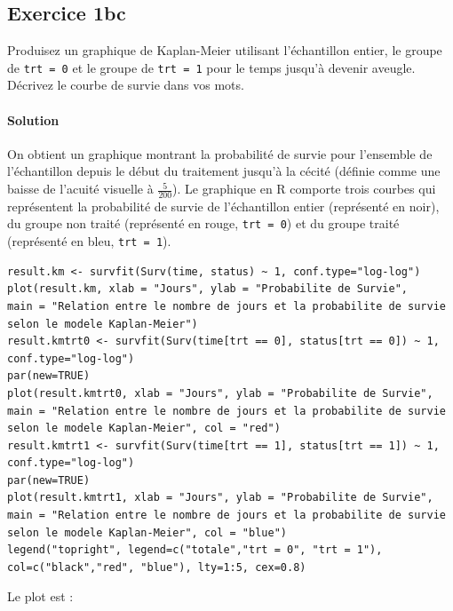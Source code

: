 \documentclass[../main.tex]{subfiles}
\begin{document}
\begin{CJK*}{UTF8}{gbsn}

\section*{Exercice 1bc}
Produisez un graphique de Kaplan-Meier utilisant l'échantillon entier,
le groupe de \texttt{trt = 0} et le groupe de \texttt{trt = 1} 
pour le temps jusqu'à devenir aveugle.
Décrivez le courbe de survie dans vos mots.

\paragraph{Solution}

On obtient un graphique montrant la probabilité de survie pour 
l'ensemble de l'échantillon depuis le début du traitement jusqu'à la cécité 
(définie comme une baisse de l'acuité visuelle à $\frac{5}{200}$).
Le graphique en R comporte trois courbes qui représentent 
la probabilité de survie de l'échantillon entier (représenté en noir), 
du groupe non traité (représenté en rouge, \texttt{trt = 0}) 
et du groupe traité (représenté en bleu, \texttt{trt = 1}). 

\begin{lstlisting}
result.km <- survfit(Surv(time, status) ~ 1, conf.type="log-log")
plot(result.km, xlab = "Jours", ylab = "Probabilite de Survie", 
main = "Relation entre le nombre de jours et la probabilite de survie selon le modele Kaplan-Meier")
result.kmtrt0 <- survfit(Surv(time[trt == 0], status[trt == 0]) ~ 1, conf.type="log-log")
par(new=TRUE)
plot(result.kmtrt0, xlab = "Jours", ylab = "Probabilite de Survie", 
main = "Relation entre le nombre de jours et la probabilite de survie selon le modele Kaplan-Meier", col = "red")
result.kmtrt1 <- survfit(Surv(time[trt == 1], status[trt == 1]) ~ 1, conf.type="log-log")
par(new=TRUE)
plot(result.kmtrt1, xlab = "Jours", ylab = "Probabilite de Survie", 
main = "Relation entre le nombre de jours et la probabilite de survie selon le modele Kaplan-Meier", col = "blue")
legend("topright", legend=c("totale","trt = 0", "trt = 1"), col=c("black","red", "blue"), lty=1:5, cex=0.8)
\end{lstlisting}

Le plot est :


\end{CJK*}
\end{document}
